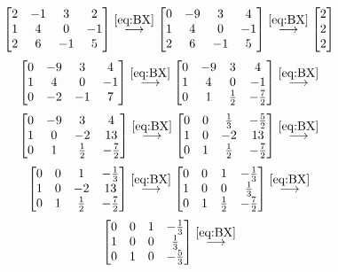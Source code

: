 \[\begin{bmatrix}2&-1&3&2\\ 1&4&0&-1\\ 2&6&-1&5\end{bmatrix}\stackrel{{\eqref{eq:BX}}}{{\longrightarrow}} \begin{bmatrix}0&-9&3&4\\ 1&4&0&-1\\ 2&6&-1&5\end{bmatrix}\stackrel{{\eqref{eq:BX}}}{{\longrightarrow}} \begin{bmatrix}2\\ 2\\ 2\end{bmatrix}\] \[\begin{bmatrix}0&-9&3&4\\ 1&4&0&-1\\ 0&-2&-1&7\end{bmatrix}\stackrel{{\eqref{eq:BX}}}{{\longrightarrow }}\begin{bmatrix}0&-9&3&4\\ 1&4&0&-1\\ 0&1&\frac{1}{2}&-\frac{7}{2}\end{bmatrix}\stackrel{{\eqref{eq:BX}}}{{ \longrightarrow}}\] \[\begin{bmatrix}0&-9&3&4\\ 1&0&-2&13\\ 0&1&\frac{1}{2}&-\frac{7}{2}\end{bmatrix}\stackrel{{\eqref{eq:BX}}}{{ \longrightarrow}}\begin{bmatrix}0&0&\frac{1}{3}&-\frac{5}{2}\\ 1&0&-2&13\\ 0&1&\frac{1}{2}&-\frac{7}{2}\end{bmatrix}\stackrel{{\eqref{eq:BX}}}{{ \longrightarrow}}\] \[\begin{bmatrix}0&0&1&-\frac{1}{3}\\ 1&0&-2&13\\ 0&1&\frac{1}{2}&-\frac{7}{2}\end{bmatrix}\stackrel{{\eqref{eq:BX}}}{{ \longrightarrow}}\begin{bmatrix}0&0&1&-\frac{1}{3}\\ 1&0&0&\frac{1}{3}\\ 0&1&\frac{1}{2}&-\frac{7}{2}\end{bmatrix}\stackrel{{\eqref{eq:BX}}}{{ \longrightarrow}}\] \[\begin{bmatrix}0&0&1&-\frac{1}{3}\\ 1&0&0&\frac{1}{3}\\ 0&1&0&-\frac{5}{3}\end{bmatrix}\stackrel{{\eqref{eq:BX}}}{{ \longrightarrow}}\]

